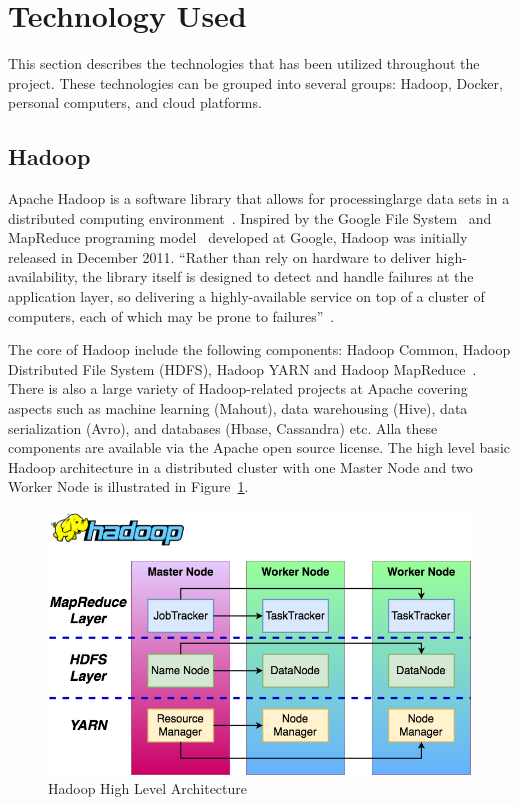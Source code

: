 \section{Technology Used}\label{s:techused}

This section describes the technologies that has been utilized
throughout the project. These technologies can be grouped into several
groups: Hadoop, Docker, personal computers, and cloud platforms.

\subsection{Hadoop}
Apache Hadoop is a software library that allows for processinglarge data sets 
in a distributed computing environment~\cite{hid-sp18-405-hadoop-wiki}. 
Inspired by the Google File 
System~\cite{hid-sp18-405-ghem2003goolefilesystem} and MapReduce 
programing model~\cite{hid-sp18-405-dean2008mapreduce} developed at 
Google, Hadoop was initially released in December 2011. ``Rather than rely 
on hardware to deliver high-availability, the library itself is designed 
to detect and handle failures at the application layer, so delivering a 
highly-available service on top of a cluster of computers, each of which may 
be prone to failures''~\cite{hid-sp18-405-hadoop-official}.

The core of Hadoop include the following components: Hadoop Common, 
Hadoop Distributed File System (HDFS), Hadoop YARN and Hadoop 
MapReduce~\cite{hid-sp18-405-hadoop-official}. There is also a large variety 
of Hadoop-related projects at Apache covering aspects such as machine 
learning (Mahout), data warehousing (Hive), data serialization (Avro), and 
databases (Hbase, Cassandra) etc. Alla these components are available
via the Apache open source license. The high level basic Hadoop architecture 
in a distributed cluster with one Master Node and two Worker Node is 
illustrated in Figure~\ref{f:hadoop-high}.

\begin{figure}[!ht]
	\centering\includegraphics[width=\columnwidth]{images/hadoop.png}
	 \caption{Hadoop High Level Architecture}\label{f:hadoop-high}
\end{figure}

